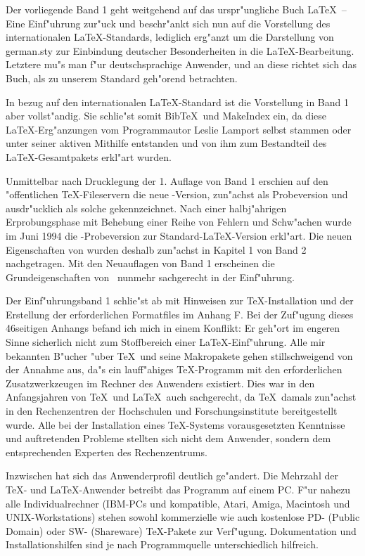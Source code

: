 \documentclass{article}
\begin{document}
Der vorliegende Band 1 geht weitgehend auf das urspr"ungliche Buch 
\LaTeX\ -- Eine Einf"uhrung zur"uck und beschr"ankt sich nun auf die
Vorstellung des internationalen \LaTeX-Standards, lediglich erg"anzt
um die Darstellung von german.sty zur Einbindung deutscher 
Besonderheiten in die \LaTeX-Bearbeitung. Letztere mu"s man f"ur 
deutschsprachige Anwender, und an diese richtet sich das Buch, als zu
unserem Standard geh"orend betrachten. 

In bezug auf den internationalen \LaTeX-Standard ist die Vorstellung
in Band 1 aber vollst"andig. Sie schlie"st somit Bib\TeX\
und MakeIndex ein, da diese \LaTeX-Erg"anzungen
vom Programmautor Leslie Lamport selbst stammen oder unter seiner
aktiven Mithilfe entstanden und von ihm zum Bestandteil des \LaTeX-Gesamtpakets 
erkl"art wurden.

Unmittelbar nach Drucklegung der 1. Auflage von Band 1 erschien auf den
"offentlichen \TeX-Fileservern die neue \LaTeXe-Version, zun"achst als
Probeversion und ausdr"ucklich als solche gekennzeichnet. Nach einer
halbj"ahrigen Erprobungsphase mit Behebung einer Reihe von Fehlern und
Schw"achen wurde im Juni 1994 die \LaTeXe-Probeversion zur
Standard-\LaTeX-Version erkl"art. Die neuen Eigenschaften von \LaTeXe wurden
deshalb zun"achst in Kapitel 1 von Band 2 nachgetragen. Mit den Neuauflagen
von Band 1 erscheinen die Grundeigenschaften
von \LaTeXe\ nunmehr sachgerecht in der Einf"uhrung. 

Der Einf"uhrungsband 1 schlie"st ab mit Hinweisen zur \TeX-Installation und der
Erstellung der erforderlichen Formatfiles im Anhang F. 
Bei der Zuf"ugung dieses 46seitigen Anhangs befand ich mich in einem Konflikt:
Er geh"ort im engeren Sinne sicherlich nicht zum Stoffbereich einer 
\LaTeX-Einf"uhrung.
Alle mir bekannten B"ucher "uber \TeX\ und seine Makropakete gehen
stillschweigend von der Annahme aus, da"s ein lauff"ahiges \TeX-Programm
mit den erforderlichen Zusatzwerkzeugen im Rechner des Anwenders existiert.
Dies war in den Anfangsjahren von \TeX\ und \LaTeX\ auch sachgerecht, da
\TeX\ damals zun"achst in den Rechenzentren der Hochschulen und 
Forschungsinstitute bereitgestellt wurde. Alle bei der Installation eines
\TeX-Systems vorausgesetzten Kenntnisse und auftretenden Probleme stellten
sich nicht dem Anwender, sondern dem entsprechenden Experten des
Rechenzentrums.

Inzwischen hat sich das Anwenderprofil deutlich ge"andert. Die Mehrzahl
der \TeX- und \LaTeX-Anwender betreibt das Programm auf einem PC. 
F"ur nahezu alle Individualrechner (IBM-PCs und kompatible, Atari, Amiga,
Macintosh und UNIX-Workstations) stehen sowohl kommerzielle wie auch
kostenlose PD- (Public Domain) oder SW- (Shareware) \TeX-Pakete zur 
Verf"ugung. Dokumentation und Installationshilfen sind je nach Programmquelle
unterschiedlich hilfreich. 
\end{document}
